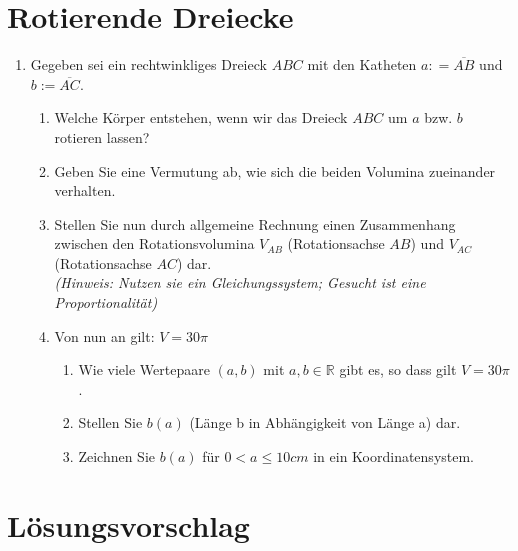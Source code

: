 \documentclass{scrartcl}
\begin{document}
	\section{Rotierende Dreiecke}
		
	\begin{enumerate}
		\item Gegeben sei ein rechtwinkliges Dreieck $ABC$ mit den Katheten $a: = \overline{AB}$ und $b := \overline{AC}$. 
			\begin{enumerate}
				\item Welche Körper entstehen, wenn wir das Dreieck $ABC$ um $a$ bzw. $b$ rotieren lassen? 
				\item Geben Sie eine Vermutung ab, wie sich die beiden Volumina zueinander verhalten.
				\item Stellen Sie nun durch allgemeine Rechnung einen Zusammenhang zwischen den Rotationsvolumina $V_{AB}$ (Rotationsachse $AB$) und $V_{AC}$ (Rotationsachse $AC$) dar. \\ \emph{(Hinweis: Nutzen sie ein Gleichungssystem; Gesucht ist eine Proportionalität)}
				\item Von nun an gilt: $V=30 \pi$
					\begin{enumerate}
						\item Wie viele Wertepaare $(a,b)$ mit $a,b \in \mathbb{R}$ gibt es, so dass gilt $V=30 \pi$.
						\item Stellen Sie $b(a)$ (Länge b in Abhängigkeit von Länge a) dar.
						\item Zeichnen Sie $b(a)$ für $0 < a  \leq 10cm $ in ein Koordinatensystem.
					\end{enumerate} 	
				
			\end{enumerate}
				
	\end{enumerate} 
	\newpage
	
	\section{Lösungsvorschlag}
		
\end{document}
